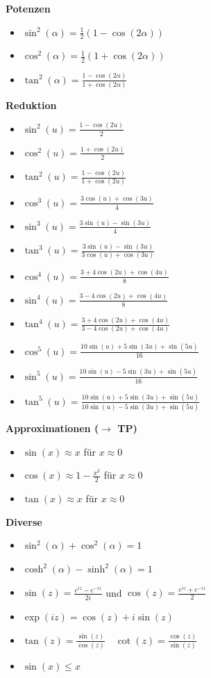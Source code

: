\begin{flushleft}
\textbf{Potenzen}
\begin{itemize}[leftmargin = *]
 \item $\sin^2(\alpha) = \frac{1}{2}(1-\cos(2\alpha))$
 \item $\cos^2(\alpha) = \frac{1}{2}(1+\cos(2\alpha))$
 \item $\tan^2(\alpha) = \frac{1-\cos(2\alpha)}{1+\cos(2\alpha)}$
\end{itemize}

\textbf{Reduktion}
\begin{itemize}[leftmargin = *]
\item $\sin^2(u) = \frac{1-\cos(2u)}{2}$
\item $\cos^2(u) = \frac{1+\cos(2u)}{2}$
\item $\tan^2(u) = \frac{1-\cos(2u)}{1+\cos(2u)}$

\item $\cos^3(u) = \frac{3 \cos(u)+\cos(3u)}{4}$
\item $\sin^3(u) = \frac{3 \sin(u)-\sin(3u)}{4}$
\item $\tan^3(u) = \frac{3 \sin(u)-\sin(3u)}{3 \cos(u)+\cos(3u)}$ 

\item $\cos^4(u) = \frac{3+ 4 \cos(2u) + \cos(4u)}{8}$
\item $\sin^4(u) = \frac{3- 4 \cos(2u) + \cos(4u)}{8}$
\item $\tan^4(u) = \frac{3+ 4 \cos(2u) + \cos(4u)}{3-4 \cos(2u) + \cos(4u)}$
 
\item $\cos^5(u) = \frac{10 \sin(u) + 5 \sin(3u)+ \sin(5u)}{16}$
\item $\sin^5(u) = \frac{10 \sin(u) - 5 \sin(3u)+ \sin(5u)}{16}$
\item $\tan^5(u) = \frac{10 \sin(u) + 5 \sin(3u)+ \sin(5u)}{10 \sin(u) - 5 \sin(3u)+ \sin(5u)}$ 
\end{itemize}

\textbf{Approximationen ($\rightarrow$ TP)}
\begin{itemize}[leftmargin = *]
\item $\sin (x) \approx x$ für $x \approx 0$
\item $\cos (x) \approx 1-\frac{x^2}{2}$ für $x \approx 0$
\item  $\tan (x) \approx x$ für $x \approx 0$ 
\end{itemize}


\textbf{Diverse}

\begin{itemize}[leftmargin = *]
 \item $\sin^2(\alpha) + \cos^2(\alpha) = 1$
 \item $\cosh^2(\alpha) - \sinh^2(\alpha) = 1$
 \item $\sin(z) = \frac{e^{iz} - e^{-iz}}{2i}$ und $\cos(z) = \frac{e^{iz} + e^{-iz}}{2}$
 \item $\exp (iz) = \cos(z) + i \sin(z)$
 \item $\tan(z)=\frac{\sin(z)}{\cos(z)}\quad \cot(z)=\frac{\cos(z)}{\sin(z)}$
 \item $\sin(x)\leq x$
\end{itemize}


\end{flushleft}
